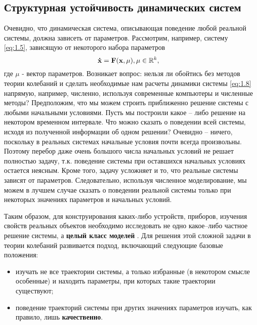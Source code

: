 \subsection{Структурная устойчивость динамических систем} %
Очевидно, что динамическая система, описывающая поведение любой
реальной системы, должна зависеть от параметров. Рассмотрим, например, систему \eqref{eq:1.5}, зависящую от некоторого набора параметров
\begin{equation}
	\label{eq:1.8}
	\mathbf {\dot x} = \mathbf F(\mathbf x, \mathbf \mu), \mu \in \mathbb{R}^k,
\end{equation}
где $\mu$ - вектор параметров. Возникает вопрос: нельзя ли обойтись без методов теории колебаний и сделать необходимые нам расчеты динамики системы \eqref{eq:1.8} напрямую, например, численно, используя современные компьютеры и численные методы? Предположим, что мы можем строить приближенно решение системы с любыми начальными условиями. Пусть мы построили какое
– либо решение на некотором временном интервале. Что можно сказать о поведении всей системы, исходя из полученной информации об одном решении? Очевидно – ничего, поскольку в реальных системах начальные условия почти всегда произвольны. Поэтому перебор даже очень большого числа начальных условий не решает полностью задачу, т.к. поведение системы  при оставшихся начальных условиях остается неясным. Кроме того, задачу
усложняет и то, что реальные системы зависят от параметров. Следовательно, используя численное моделирование, мы можем в лучшем случае сказать о  поведении реальной системы только при некоторых значениях параметров и
начальных условий.

Таким образом, для конструирования каких-либо устройств, приборов,
изучения свойств реальных объектов необходимо исследовать не одно какое–либо частное решение системы, а \textbf{целый класс моделей} . Для решения этой
сложной задачи в теории колебаний развивается подход, включающий
следующие базовые положения:
\begin{itemize}
	\item изучать не все траектории системы, а только избранные (в некотором смысле особенные) и находить параметры, при которых такие траектории существуют;
	\item поведение траекторий системы при других значениях параметров изучать, как правило, лишь \textbf{качественно}. 
\end{itemize}

